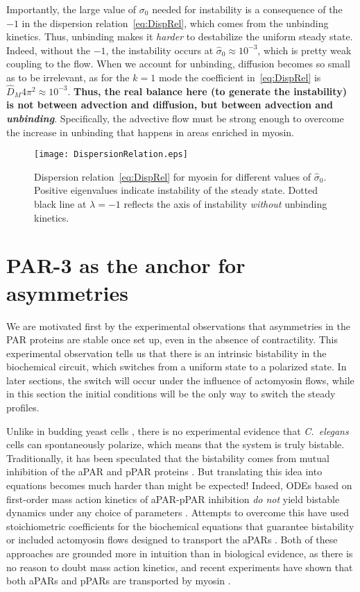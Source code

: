 \documentclass[11pt]{article}
\newcommand{\6}[1]{#1_{\text{6}}}
\newcommand{\3}[1]{#1_{\text{3}}}
\begin{document}
Importantly, the large value of $\sigma_0$ needed for instability is a consequence of the $-1$ in the dispersion relation\ \eqref{eq:DispRel}, which comes from the unbinding kinetics. Thus, unbinding makes it \emph{harder} to destabilize the uniform steady state. Indeed, without the $-1$, the instability occurs at $\hat{\sigma}_0 \approx 10^{-3}$, which is pretty weak coupling to the flow. When we account for unbinding, diffusion becomes so small as to be irrelevant, as for the $k=1$ mode the coefficient in\ \eqref{eq:DispRel} is $\hat{D}_M 4 \pi^2 \approx 10^{-3}$. \textbf{Thus, the real balance here (to generate the instability) is not between advection and diffusion, but between advection and \emph{unbinding}}. Specifically, the advective flow must be strong enough to overcome the increase in unbinding that happens in areas enriched in myosin. 

\begin{figure}
\centering
\texttt{[image: DispersionRelation.eps]}
\caption{\label{fig:DispRelMy}Dispersion relation\ \eqref{eq:DispRel} for myosin for different values of $\hat{\sigma}_0$. Positive eigenvalues indicate instability of the steady state. Dotted black line at $\lambda=-1$ reflects the axis of instability \emph{without} unbinding kinetics.}
\end{figure}

\section{PAR-3 as the anchor for asymmetries \label{sec:Biochem}}
We are motivated first by the experimental observations that asymmetries in the PAR proteins are stable once set up, even in the absence of contractility. This experimental observation tells us that there is an intrinsic bistability in the biochemical circuit, which switches from a uniform state to a polarized state. In later sections, the switch will occur under the influence of actomyosin flows, while in this section the initial conditions will be the only way to switch the steady profiles.

Unlike in budding yeast cells \cite{mogilner2012cell}, there is no experimental evidence that \emph{C.\ elegans} cells can spontaneously polarize, which means that the system is truly bistable. Traditionally, it has been speculated that the bistability comes from mutual inhibition of the aPAR and pPAR proteins \cite{halatek2018self, trong2014parameter}. But translating this idea into equations becomes much harder than might be expected! Indeed, ODEs based on first-order mass action kinetics of aPAR-pPAR inhibition \emph{do not} yield bistable dynamics under any choice of parameters \cite{dawes20113}. Attempts to overcome this have used stoichiometric coefficients for the biochemical equations that guarantee bistability \cite{goehring2011polarization, gross2019guiding} or included actomyosin flows designed to transport the aPARs \cite{TH2008}. Both of these approaches are grounded more in intuition than in biological evidence, as there is no reason to doubt mass action kinetics, and recent experiments have shown that both aPARs and pPARs are transported by myosin \cite{illukkumbura2023design}. 
\end{document}
